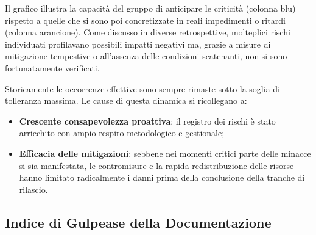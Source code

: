 \documentclass[a4paper,11pt,oneside]{scrartcl}
\begin{document}
Il grafico illustra la capacità del gruppo di anticipare le criticità (colonna blu) rispetto a quelle che si sono poi concretizzate in reali impedimenti o ritardi (colonna arancione). Come discusso in diverse retrospettive, molteplici rischi individuati profilavano possibili impatti negativi ma, grazie a misure di mitigazione tempestive o all'assenza delle condizioni scatenanti, non si sono fortunatamente verificati.

Storicamente le occorrenze effettive sono sempre rimaste sotto la soglia di tolleranza massima.
Le cause di questa dinamica si ricollegano a:
\begin{itemize}
    \item \textbf{Crescente consapevolezza proattiva}: il registro dei rischi è stato arricchito con ampio respiro metodologico e gestionale;
    \item \textbf{Efficacia delle mitigazioni}: sebbene nei momenti critici parte delle minacce si sia manifestata, le contromisure e la rapida redistribuzione delle risorse hanno limitato radicalmente i danni prima della conclusione della tranche di rilascio.
\end{itemize}

\subsection{Indice di Gulpease della Documentazione}
\end{document}
